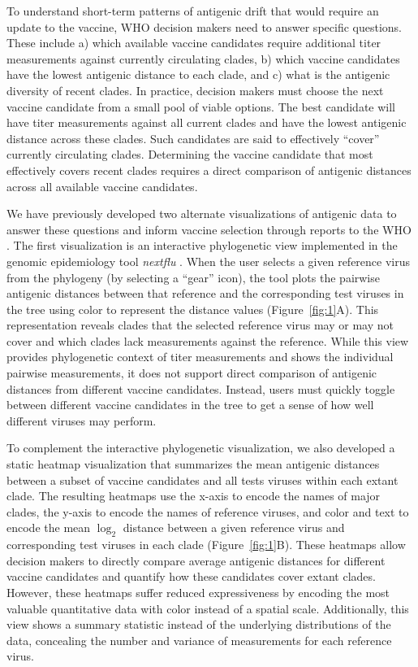 \documentclass[utf8]{FrontiersinHarvard} %
\begin{document}
To understand short-term patterns of antigenic drift that would require an update to the vaccine, WHO decision makers need to answer specific questions.
These include a) which available vaccine candidates require additional titer measurements against currently circulating clades, b) which vaccine candidates have the lowest antigenic distance to each clade, and c) what is the antigenic diversity of recent clades.
In practice, decision makers must choose the next vaccine candidate from a small pool of viable options.
The best candidate will have titer measurements against all current clades and have the lowest antigenic distance across these clades.
Such candidates are said to effectively ``cover'' currently circulating clades.
Determining the vaccine candidate that most effectively covers recent clades requires a direct comparison of antigenic distances across all available vaccine candidates.

We have previously developed two alternate visualizations of antigenic data to answer these questions and inform vaccine selection through reports to the WHO \citep{BedfordWHO2018,BedfordWHO2019}.
The first visualization is an interactive phylogenetic view implemented in the genomic epidemiology tool \emph{nextflu} \citep{NeherBedford2015,NeherBedford2018}.
When the user selects a given reference virus from the phylogeny (by selecting a ``gear'' icon), the tool plots the pairwise antigenic distances between that reference and the corresponding test viruses in the tree using color to represent the distance values (Figure~\ref{fig:1}A).
This representation reveals clades that the selected reference virus may or may not cover and which clades lack measurements against the reference.
While this view provides phylogenetic context of titer measurements and shows the individual pairwise measurements, it does not support direct comparison of antigenic distances from different vaccine candidates.
Instead, users must quickly toggle between different vaccine candidates in the tree to get a sense of how well different viruses may perform.

To complement the interactive phylogenetic visualization, we also developed a static heatmap visualization that summarizes the mean antigenic distances between a subset of vaccine candidates and all tests viruses within each extant clade.
The resulting heatmaps use the x-axis to encode the names of major clades, the y-axis to encode the names of reference viruses, and color and text to encode the mean $\log_{2}$ distance between a given reference virus and corresponding test viruses in each clade (Figure~\ref{fig:1}B).
These heatmaps allow decision makers to directly compare average antigenic distances for different vaccine candidates and quantify how these candidates cover extant clades.
However, these heatmaps suffer reduced expressiveness by encoding the most valuable quantitative data with color instead of a spatial scale.
Additionally, this view shows a summary statistic instead of the underlying distributions of the data, concealing the number and variance of measurements for each reference virus.
\end{document}
